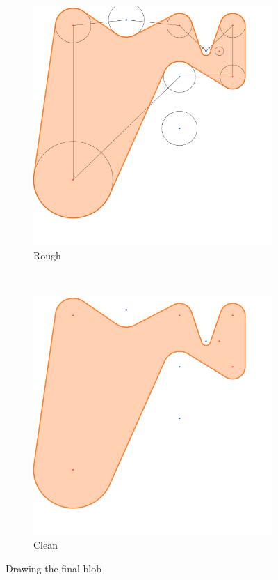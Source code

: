 \documentclass[paper=a4, fontsize=11pt]{scrartcl} %
\numberwithin{equation}{section} %
\numberwithin{figure}{section} %
\numberwithin{table}{section} %
\begin{document}
\begin{figure}[h]
        \centering
        \begin{subfigure}[b]{0.4\textwidth}
                \includegraphics[width=\textwidth]{blob_rough}
                \caption{Rough}
        \end{subfigure}%
        ~ %
        \begin{subfigure}[b]{0.4\textwidth}
                \includegraphics[width=\textwidth]{blob_clean}
                \caption{Clean}
        \end{subfigure}
        \caption{Drawing the final blob}\label{fig:blob}
\end{figure}
\end{document}
